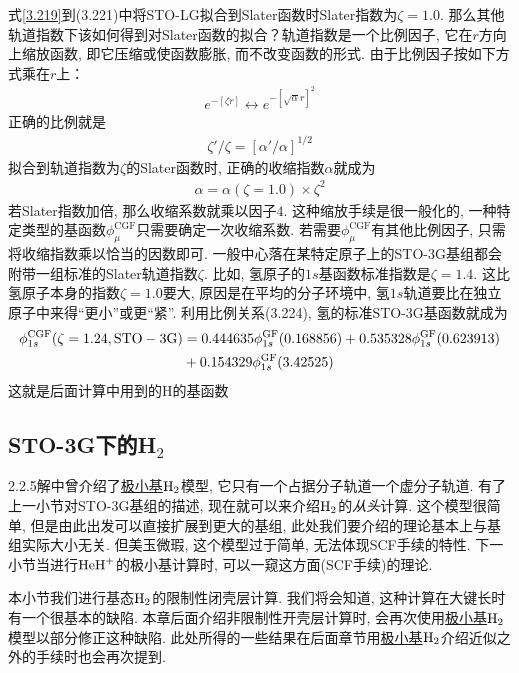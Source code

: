 式\eqref{3.219}到(3.221)中将STO-LG拟合到Slater函数时Slater指数为$\zeta=1.0$. 那么其他轨道指数下该如何得到对Slater函数的拟合？轨道指数是一个比例因子, 它在$r$方向上缩放函数, 即它压缩或使函数膨胀, 而不改变函数的形式. 由于比例因子按如下方式乘在$r$上：
\begin{align}
e^{-[\zeta r]} \leftrightarrow e^{-[\sqrt{\alpha}r]^2}
\end{align}
正确的比例就是
\begin{align}
\zeta'/\zeta=[\alpha'/\alpha]^{1/2}
\end{align}
拟合到轨道指数为$\zeta$的Slater函数时, 正确的收缩指数$\alpha$就成为
\begin{align}
\alpha = \alpha(\zeta=1.0)\times \zeta^2
\end{align}
若Slater指数加倍, 那么收缩系数就乘以因子$4$. 这种缩放手续是很一般化的, 一种特定类型的基函数$\phi_\mu^\mathrm{CGF}$只需要确定一次收缩系数. 若需要$\phi_\mu^\mathrm{CGF}$有其他比例因子, 只需将收缩指数乘以恰当的因数即可. 一般中心落在某特定原子上的STO-3G基组都会附带一组标准的Slater轨道指数$\zeta$. 比如, 氢原子的$1s$基函数标准指数是$\zeta=1.4$. 这比氢原子本身的指数$\zeta=1.0$要大, 原因是在平均的分子环境中, 氢$1s$轨道要比在独立原子中来得``更小”或更``紧”. 利用比例关系(3.224), 氢的标准STO-3G基函数就成为
\begin{align}
\label{3.225}
\phi_{1s}^\mathrm{CGF}(\zeta=1.24,\mathrm{STO-3G}) & = 0.444635\phi_{1s}^\mathrm{GF}(0.168856) + 0.535328\phi_{1s}^\mathrm{GF}(0.623913) \notag\\
& + 0.154329\phi_{1s}^\mathrm{GF}(3.42525)
\end{align}
这就是后面计算中用到的$\mathrm{H}$的基函数
\subsection{STO-3G下的H$_2$}
2.2.5解中曾介绍了\underline{极小基$\mathrm{H}_2$}模型, 它只有一个占据分子轨道一个虚分子轨道. 有了上一小节对STO-3G基组的描述, 现在就可以来介绍$\mathrm{H}_2$的\emph{从头}\hft 计算. 这个模型很简单, 但是由此出发可以直接扩展到更大的基组, 此处我们要介绍的\hft 理论基本上与基组实际大小无关. 但美玉微瑕, 这个模型过于简单, 无法体现SCF手续的特性. 下一小节当进行$\mathrm{HeH}^+$的极小基计算时, 可以一窥这方面(SCF手续)的\hft 理论.

本小节我们进行基态$\mathrm{H}_2$的限制性闭壳层计算. 我们将会知道, 这种计算在大键长时有一个很基本的缺陷. 本章后面介绍非限制性开壳层计算时, 会再次使用\underline{极小基$\mathrm{H}_2$}模型以部分修正这种缺陷. 此处所得的一些结果在后面章节用\underline{极小基$\mathrm{H}_2$}介绍\hft 近似之外的手续时也会再次提到.

